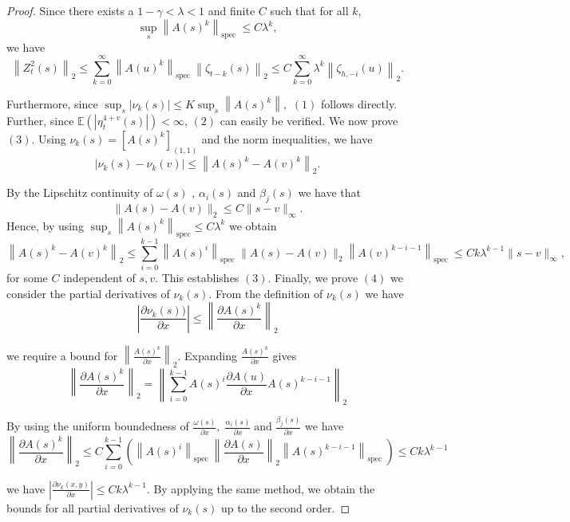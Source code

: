 \documentclass[10pt,a4paper]{amsart}
\begin{document}
\begin{proof}
Since there exists a $1-\gamma<\lambda <1$ and finite $C$ such that for all $k$,
$$
\sup _s\left\|A(s)^k\right\|_{\text {spec }} \leq C \lambda^k,
$$
 we have
$$
\left\|Z_t^2(s)\right\|_2 \leq  \sum_{k=0}^{\infty}\left\|A(u)^k\right\|_{\text {spec }} \left\|\zeta_{t-k}(s)\right\|_2 \leq C \sum_{k=0}^{\infty} \lambda^k\left\|\zeta_{h,-i}(u)\right\|_2.
$$

Furthermore, since   $ \sup_s\left|\nu_k(s) \right| \leq K \sup_s \left\|A(s)^k\right\|,$ $(1)$ follows directly.
Further, since $\mathbb{E}\left(\left| \eta_t^{4+v}(s)\right| \right)<\infty$, $(2)$ can easily be verified.
We now prove $(3)$. Using $\nu_k(s)= [A(s)^k]_{(1, 1)}$ and the norm inequalities, we have
$$
 \left|\nu_k(s)-\nu_k(v)\right| \leq \left\|A(s)^k -A(v)^k \right\|_2  
.$$


By the Lipschitz continuity of $ \omega(s)$ , $\alpha_i(s)$ and $\beta_j(s)$ we have that $$\|A(s)-A(v)\|_2 \leq C\|s-v\|_\infty .$$ Hence, by using $\sup _s\left\|A(s)^k\right\|_{\text {spec}} \leq C \lambda^k $ we obtain
$$
\left\|A(s)^k-A(v)^k\right\|_2 \leq \sum_{i=0}^{k-1}\left\|A(s)^{i}\right\|_{\text {spec }} \| A(s)- A(v)\|_2\left\| A(v)^{k-i-1}\right\|_{ \text {spec }} \leq C k \lambda^{k-1}\|s-v\|_{\infty},
$$
for some $C$ independent of $s, v$. This establishes $(3)$.
Finally, we prove $(4)$ we consider the partial derivatives of $\nu_k(s)$. From the definition of $\nu_k(s)$ we have
$$
\left|\frac{\partial \nu_k(s))}{\partial x}\right|  \leq\left\|\frac{\partial A(s)^k }{\partial x}\right\|_2 
$$

 we require a bound for $\left\|\frac{ A(s)^k}{\partial x}\right\|_2$. Expanding $\frac{A(s)^k}{\partial x}$ gives
$$
\left\|\frac{\partial A(s)^k}{\partial x}\right\|_2=\left\|\sum_{i=0}^{k-1} A(s)^i \frac{\partial A(u)}{\partial x} A(s)^{k-i-1}\right\|_2
$$

By using the uniform boundedness of $\frac{ \omega(s)}{\partial x}, \; \frac{ \alpha_i(s)}{\partial x}\;  \text{and}  \; \frac{ \beta_j(s)}{\partial x}$ we have
$$
\left\|\frac{\partial A(s)^k}{\partial x}\right\|_2 \leq C \sum_{i=0}^{k-1}\left(\left\|A(s)^i\right\|_{\text {spec }} \left\|\frac{\partial A(s)}{\partial x}\right\|_2 \left\|A(s)^{k-i-1}\right\|_{\text {spec }}\right) \leq C k \lambda^{k-1}
$$

 we have $\left| \frac{\partial \nu_k(x,y)}{\partial x } \right| \leq C k \lambda^{k-1}$. By applying the same method, we obtain the bounds for all partial derivatives of $\nu_k(s)$ up to the second order.

\end{proof}
\end{document}
